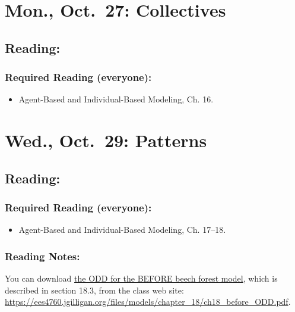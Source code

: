 \documentclass[
]{article}
\providecommand{\tightlist}{%
  \setlength{\itemsep}{0pt}\setlength{\parskip}{0pt}}
\begin{document}
\section{Mon., Oct.~27: Collectives}\label{mon.-oct.-27-collectives}

\subsection{Reading:}\label{reading-18}

\subsubsection{Required Reading
(everyone):}\label{required-reading-everyone-15}

\begin{itemize}
\tightlist
\item
  Agent-Based and Individual-Based Modeling, Ch. 16.
\end{itemize}

\section{Wed., Oct.~29: Patterns}\label{wed.-oct.-29-patterns}

\subsection{Reading:}\label{reading-19}

\subsubsection{Required Reading
(everyone):}\label{required-reading-everyone-16}

\begin{itemize}
\tightlist
\item
  Agent-Based and Individual-Based Modeling, Ch. 17--18.
\end{itemize}

\subsubsection{Reading Notes:}\label{reading-notes-14}

You can download \href{/files/models/chapter_18/ch18_before_ODD.pdf}{the
ODD for the BEFORE beech forest model}, which is described in section
18.3, from the class web site:
\url{https://ees4760.jgilligan.org/files/models/chapter_18/ch18_before_ODD.pdf}.
\end{document}
